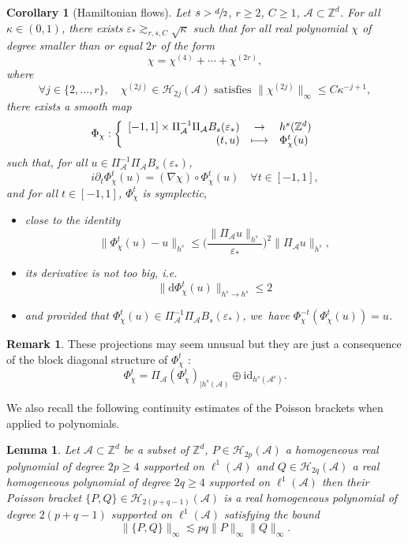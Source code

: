 \documentclass[10pt,a4paper]{amsart}
\providecommand{\ie}{i.e.}
\let\dpl\displaystyle
\newcommand\mto{\mathchoice{\longmapsto}{\mapsto}{\mapsto}{\mapsto}}
\theoremstyle{plain}
\newtheorem{corollary}[theorem]{Corollary}
\newtheorem{lemma}[theorem]{Lemma}
\theoremstyle{definition}
\newtheorem{remark}[theorem]{Remark}
\newcommand{\1}{\mathbf{1}}
\begin{document}
\begin{corollary}[Hamiltonian flows]\label{cor:flow} Let $s > \sfrac{d}{2}$, $r\geq 2$, $C\geq 1$, $\mathcal{A} \subset \mathbb{Z}^d$. For all $\kappa \in (0,1)$, there exists $\varepsilon_* \gtrsim_{r,s,C} \sqrt{\kappa}$ such that for all real polynomial $\chi$ of degree smaller than or equal $2r$ of the form
\[
\chi = \chi^{(4)} + \cdots + \chi^{(2r)},
\]
where
\[
\forall j\in \{ 2,\dots,r\}, \quad \chi^{(2j)} \in \mathcal{H}_{2j}(\mathcal{A})\text{ satisfies } \| \chi^{(2j)} \|_{\infty} \leq C\kappa^{-j+1},
\]
there exists a smooth map
\[
\Phi_{\chi} : \left\{
\begin{array}{rcl} [-1,1] \times \Pi_{\mathcal{A}}^{-1}\Pi_{\mathcal{A}}B_s(\varepsilon_*) & \dpl\to & h^s(\mathbb{Z}^d) \\
(t,u) & \dpl\mto & \Phi_\chi^t(u)
\end{array}\right.
\]
such that, for all $u\in \Pi_{\mathcal{A}}^{-1}\Pi_{\mathcal{A}}B_s(\varepsilon_*) $,
\[
i\partial_t \Phi_\chi^t(u) = (\nabla \chi)\circ \Phi_\chi^t (u) \quad \forall t \in [-1,1],
\]
and for all $t\in [-1,1]$, $\Phi_\chi^t$ is symplectic,
\begin{itemize}
\item close to the identity
\[
\| \Phi_\chi^t(u) - u \|_{h^s} \leq \Big(\frac{\| \Pi_{\mathcal{A}}u \|_{h^s}}{ \varepsilon_* } \Big)^2 \| \Pi_{\mathcal{A}} u\|_{h^s},
\]
\item its derivative is not too big, \ie
\begin{equation}
\label{eq:d-varphi}
\| \mathrm{d} \Phi_\chi^t(u) \|_{h^s \to h^s} \leq 2
\end{equation}
\item and provided that $\Phi_\chi^t(u) \in \Pi_{\mathcal{A}}^{-1}\Pi_{\mathcal{A}}B_s(\varepsilon_*)$, we~have $\Phi_\chi^{-t}(\Phi_\chi^t(u)) = u $.
\end{itemize}
\end{corollary}

\begin{remark}
These projections may seem unusual but they are just a consequence of the block diagonal structure of $\Phi_\chi^t$ :
\[
\Phi_\chi^t = \Pi_{\mathcal{A}} (\Phi_\chi^t)_{| h^s(\mathcal{A})} \oplus \mathrm{id}_{h^s(\mathcal{A}^c)}.
\]
\end{remark}

We also recall the following continuity estimates of the Poisson brackets when applied to polynomials.
\begin{lemma} Let $\mathcal{A} \subset \mathbb{Z}^d$ be a subset of $\mathbb{Z}^d$, $P \in \mathcal{H}_{2p}(\mathcal{A})$ a homogeneous real polynomial of degree $2p\geq 4$ supported on $\ell^1(\mathcal{A})$ and $Q \in \mathcal{H}_{2q}(\mathcal{A})$ a real homogeneous polynomial of degree $2q\geq 4$ supported on $\ell^1(\mathcal{A})$ then their Poisson bracket $\{P,Q\} \in \mathcal{H}_{2(p+q-1)}(\mathcal{A})$ is a real homogeneous polynomial of degree $2(p+q-1)$ supported on $\ell^1(\mathcal{A})$ satisfying the bound
\[
\| \{ P,Q\} \|_{\infty} \lesssim pq \|P\|_{\infty} \| Q\|_{\infty}.
\]
\end{lemma}
\end{document}

